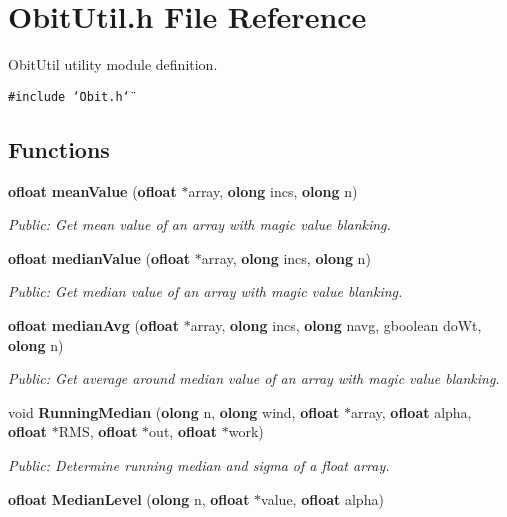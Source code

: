 \section{Obit\-Util.h File Reference}
\label{ObitUtil_8h}
Obit\-Util utility module definition. 

{\tt \#include \char`\"{}Obit.h\char`\"{}}\par
\subsection*{Functions}
\begin{CompactItemize}
\item 
{\bf ofloat} {\bf mean\-Value} ({\bf ofloat} $\ast$array, {\bf olong} incs, {\bf olong} n)
\begin{CompactList}\small\item\em Public: Get mean value of an array with magic value blanking. \item\end{CompactList}\item 
{\bf ofloat} {\bf median\-Value} ({\bf ofloat} $\ast$array, {\bf olong} incs, {\bf olong} n)
\begin{CompactList}\small\item\em Public: Get median value of an array with magic value blanking. \item\end{CompactList}\item 
{\bf ofloat} {\bf median\-Avg} ({\bf ofloat} $\ast$array, {\bf olong} incs, {\bf olong} navg, gboolean do\-Wt, {\bf olong} n)
\begin{CompactList}\small\item\em Public: Get average around median value of an array with magic value blanking. \item\end{CompactList}\item 
void {\bf Running\-Median} ({\bf olong} n, {\bf olong} wind, {\bf ofloat} $\ast$array, {\bf ofloat} alpha, {\bf ofloat} $\ast$RMS, {\bf ofloat} $\ast$out, {\bf ofloat} $\ast$work)
\begin{CompactList}\small\item\em Public: Determine running median and sigma of a float array. \item\end{CompactList}\item 
{\bf ofloat} {\bf Median\-Level} ({\bf olong} n, {\bf ofloat} $\ast$value, {\bf ofloat} alpha)

\end{CompactItemize}
